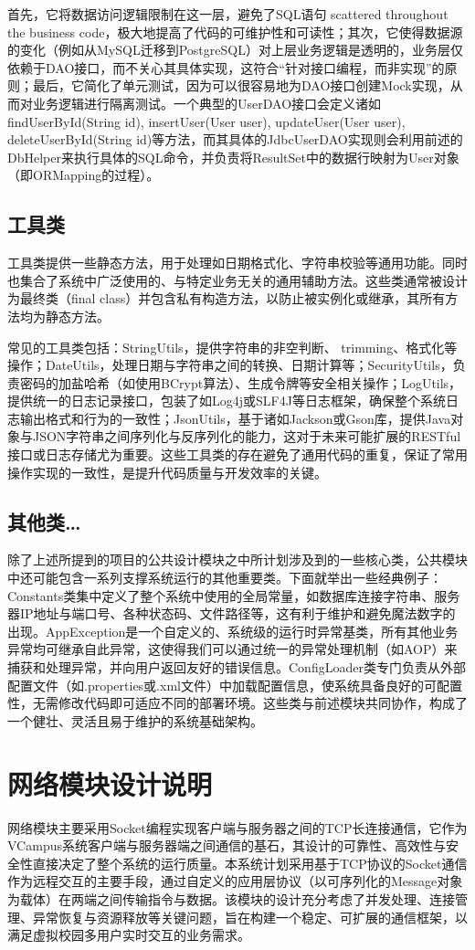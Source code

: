 \documentclass[a4paper]{ctexart}
\begin{document}
首先，它将数据访问逻辑限制在这一层，避免了SQL语句 scattered throughout the business code，极大地提高了代码的可维护性和可读性；其次，它使得数据源的变化（例如从MySQL迁移到PostgreSQL）对上层业务逻辑是透明的，业务层仅依赖于DAO接口，而不关心其具体实现，这符合“针对接口编程，而非实现”的原则；最后，它简化了单元测试，因为可以很容易地为DAO接口创建Mock实现，从而对业务逻辑进行隔离测试。一个典型的UserDAO接口会定义诸如findUserById(String id), insertUser(User user), updateUser(User user), deleteUserById(String id)等方法，而其具体的JdbcUserDAO实现则会利用前述的DbHelper来执行具体的SQL命令，并负责将ResultSet中的数据行映射为User对象（即ORMapping的过程）。
\subsection{工具类}
工具类提供一些静态方法，用于处理如日期格式化、字符串校验等通用功能。同时也集合了系统中广泛使用的、与特定业务无关的通用辅助方法。这些类通常被设计为最终类（final class）并包含私有构造方法，以防止被实例化或继承，其所有方法均为静态方法。

常见的工具类包括：StringUtils，提供字符串的非空判断、 trimming、格式化等操作；DateUtils，处理日期与字符串之间的转换、日期计算等；SecurityUtils，负责密码的加盐哈希（如使用BCrypt算法）、生成令牌等安全相关操作；LogUtils，提供统一的日志记录接口，包装了如Log4j或SLF4J等日志框架，确保整个系统日志输出格式和行为的一致性；JsonUtils，基于诸如Jackson或Gson库，提供Java对象与JSON字符串之间序列化与反序列化的能力，这对于未来可能扩展的RESTful接口或日志存储尤为重要。这些工具类的存在避免了通用代码的重复，保证了常用操作实现的一致性，是提升代码质量与开发效率的关键。
\subsection{其他类…}
除了上述所提到的项目的公共设计模块之中所计划涉及到的一些核心类，公共模块中还可能包含一系列支撑系统运行的其他重要类。下面就举出一些经典例子：Constants类集中定义了整个系统中使用的全局常量，如数据库连接字符串、服务器IP地址与端口号、各种状态码、文件路径等，这有利于维护和避免魔法数字的出现。AppException是一个自定义的、系统级的运行时异常基类，所有其他业务异常均可继承自此异常，这使得我们可以通过统一的异常处理机制（如AOP）来捕获和处理异常，并向用户返回友好的错误信息。ConfigLoader类专门负责从外部配置文件（如.properties或.xml文件）中加载配置信息，使系统具备良好的可配置性，无需修改代码即可适应不同的部署环境。这些类与前述模块共同协作，构成了一个健壮、灵活且易于维护的系统基础架构。

\section{网络模块设计说明}
网络模块主要采用Socket编程实现客户端与服务器之间的TCP长连接通信，它作为VCampus系统客户端与服务器端之间通信的基石，其设计的可靠性、高效性与安全性直接决定了整个系统的运行质量。本系统计划采用基于TCP协议的Socket通信作为远程交互的主要手段，通过自定义的应用层协议（以可序列化的Message对象为载体）在两端之间传输指令与数据。该模块的设计充分考虑了并发处理、连接管理、异常恢复与资源释放等关键问题，旨在构建一个稳定、可扩展的通信框架，以满足虚拟校园多用户实时交互的业务需求。
\end{document}
